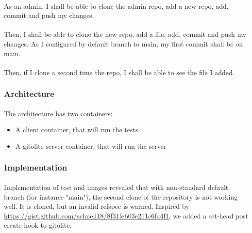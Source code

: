 \paragraph{}
As an admin, I shall be able to clone the admin repo, add a new repo, add, commit and push my changes.

\paragraph{}
Then, I shall be able to clone the new repo, add a file, add, commit and push my changes. As I configured by default branch to main, my first commit shall be on main.

\paragraph{}
Then, if I clone a second time the repo, I shall be able to see the file I added.

\subsubsection{Architecture}

\paragraph{}
The architecture has two containers:

\begin{itemize}
    \item A client container, that will run the tests
    \item A gitolite server container, that will run the server
\end{itemize}

\subsubsection{Implementation}

\paragraph{}
Implementation of test and images revealed that with non-standard default branch (for instance "main"), the second clone of the repository is not working well. It is cloned, but an invalid refspec is warned. Inspired by \url{https://gist.github.com/schnell18/8f31feb03e211c6fa4f1}, we added a set-head post create hook to gitolite.

